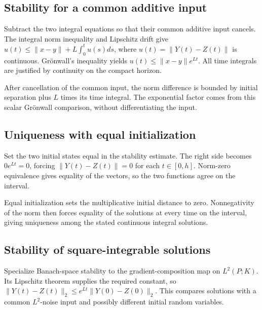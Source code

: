 \documentclass[11pt,a4paper]{article}
\begin{document}
\subsection{\texorpdfstring{Stability for a common additive input}{Stability for a common additive input}}


Subtract the two integral equations so that their common additive input cancels. The integral norm inequality and Lipschitz drift give \(u(t)\le\|x-y\|+L\int_0^t u(s)ds\), where \(u(t)=\|Y(t)-Z(t)\|\) is continuous. Grönwall's inequality yields \(u(t)\le\|x-y\|e^{Lt}\). All time integrals are justified by continuity on the compact horizon.



After cancellation of the common input, the norm difference is bounded by initial separation plus \(L\) times its time integral. The exponential factor comes from this scalar Grönwall comparison, without differentiating the input.


\subsection{\texorpdfstring{Uniqueness with equal initialization}{Uniqueness with equal initialization}}


Set the two initial states equal in the stability estimate. The right side becomes \(0e^{Lt}=0\), forcing \(\|Y(t)-Z(t)\|=0\) for each \(t\in[0,h]\). Norm-zero equivalence gives equality of the vectors, so the two functions agree on the interval.



Equal initialization sets the multiplicative initial distance to zero. Nonnegativity of the norm then forces equality of the solutions at every time on the interval, giving uniqueness among the stated continuous integral solutions.


\subsection{\texorpdfstring{Stability of square-integrable solutions}{Stability of square-integrable solutions}}


Specialize Banach-space stability to the gradient-composition map on \(L^2(P;K)\). Its Lipschitz theorem supplies the required constant, so \(\|Y(t)-Z(t)\|_2\le e^{Lt}\|Y(0)-Z(0)\|_2\). This compares solutions with a common \(L^2\)-noise input and possibly different initial random variables.
\end{document}
